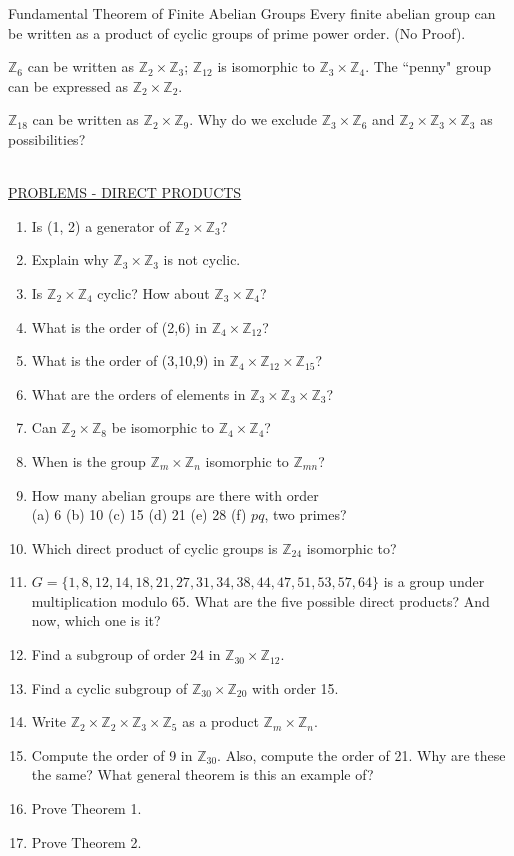 \documentclass[12pt]{book}
\theoremstyle{definition}
\def\Z{\mathbb{Z}}
\begin{document}
\begin{tctheorem}{Fundamental Theorem of Finite Abelian Groups}{}
Every finite abelian group can be written as a product of cyclic groups of prime power order. (No Proof).
\end{tctheorem}

\begin{tcexample}{}{}
$ \Z_6 $ can be written as $ \Z_2\times \Z_3 $; $ \Z_{12} $ is isomorphic to $ \Z_3 \times \Z_4 $. The ``penny" group can be expressed as $ \Z_2 \times \Z_2 $.
\end{tcexample}

\begin{tcexample}{}{}
	$ \Z_{18} $ can be written as $ \Z_2 \times \Z_9 $. Why do we exclude $ \Z_3 \times \Z_6 $ and $ \Z_2\times \Z_3\times\Z_3 $ as possibilities?
\end{tcexample}
~\\[.2in]
\underline{PROBLEMS - DIRECT PRODUCTS}
\begin{enumerate}
\item Is (1, 2) a generator of $\Z_2\times \Z_3$?
\item Explain why $ \Z_3 \times \Z_3 $ is not cyclic.
\item Is $ \Z_2\times\Z_4 $ cyclic? How about $ \Z_3\times\Z_4 $?
\item What is the order of (2,6) in $ \Z_4\times\Z_{12} $?
\item What is the order of (3,10,9) in $ \Z_4\times\Z_{12}\times\Z_{15} $?
\item What are the orders of elements in $ \Z_3\times\Z_{3}\times\Z_{3} $?
\item Can $ \Z_2\times\Z_8 $ be isomorphic to $ \Z_4\times \Z_4 $?
\item When is the group $ \Z_m\times\Z_n  $ isomorphic to $ \Z_{mn} $?
\item How many abelian groups are there with order\\
(a) 6 \quad (b) 10 \quad (c) 15 \quad (d) 21 \quad (e) 28 \quad (f) $ pq $, two primes?
\item Which direct product of cyclic groups is $ \Z_{24} $ isomorphic to?
\item $ G=\{1,8,12,14,18,21,27,31,34,38,44,47,51,53,57,64\} $ is a group under multiplication modulo 65. What are the five possible direct products? And now, which one is it? 
\item Find a subgroup of order 24 in $ \Z_{30}\times\Z_{12}. $
\item Find a cyclic subgroup of $ \Z_{30}\times\Z_{20} $ with order 15.
\item Write $ \Z_2\times\Z_2\times\Z_3\times\Z_5 $ as a product $ \Z_m\times \Z_n $.
\item Compute the order of 9 in $ \Z_{30} $. Also, compute the order of 21. Why are these the same? What general theorem is this an example of?
\item Prove Theorem 1.
\item Prove Theorem 2.

\end{enumerate}
\end{document}
